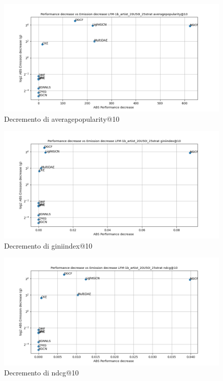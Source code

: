 \begin{figure}[H]
    \centering
     \includegraphics[width=\textwidth]{images/decrement_averagepopularity@10_LFM-1b_artist_20U50I_25strat.png}
    \caption{Decremento di averagepopularity@10}
\end{figure}

\begin{figure}[H]
    \centering
     \includegraphics[width=\textwidth]{images/decrement_giniindex@10_LFM-1b_artist_20U50I_25strat.png}
    \caption{Decremento di giniindex@10}
\end{figure}

\begin{figure}[H]
    \centering
     \includegraphics[width=\textwidth]{images/decrement_ndcg@10_LFM-1b_artist_20U50I_25strat.png}
    \caption{Decremento di ndcg@10}
\end{figure}

